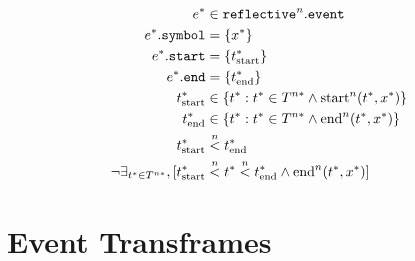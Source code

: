 \begin{align}
\label{equation:define_perceptual_event_first}
                                         e^* &\in \text{\tt{reflective}}^n.\text{\tt{event}} \\
                      e^*.\text{\tt{symbol}} &= \{x^*\} \\
                       e^*.\text{\tt{start}} &= \{t^*_\text{start}\} \\
                         e^*.\text{\tt{end}} &= \{t^*_\text{end}\} \\
                             t^*_\text{start} &\in \{t^* : t^* \in T^{n*} \wedge \text{start}^n(t^*, x^*)\} \\
                               t^*_\text{end} &\in \{t^* : t^* \in T^{n*} \wedge \text{end}^n(t^*, x^*)\} \\
                             t^*_\text{start} &\stackrel{n}{<} t^*_\text{end} \\
\label{equation:define_perceptual_event_last}
 \neg\exists_{t^* \in T^{n*}}, [t^*_\text{start} &\stackrel{n}{<} t^* \stackrel{n}{<} t^*_\text{end} \wedge \text{end}^n(t^*, x^*)]
\end{align}

\section{Event Transframes}

